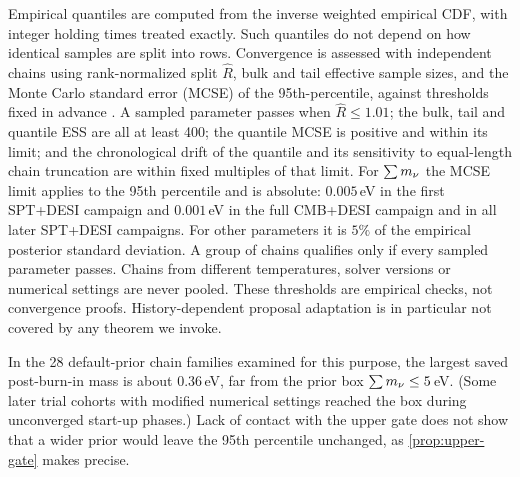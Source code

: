 Empirical quantiles are computed from the inverse weighted empirical CDF, with integer holding times treated exactly. Such quantiles do not depend on how identical samples are split into rows. Convergence is assessed with independent chains using rank-normalized split $\hat R$, bulk and tail effective sample sizes, and the Monte Carlo standard error (MCSE) of the 95th-percentile, against thresholds fixed in advance \cite{gelman_rubin1992,vehtari2021_rhat}. A sampled parameter passes when $\hat R\le1.01$; the bulk, tail and quantile ESS are all at least 400; the quantile MCSE is positive and within its limit; and the chronological drift of the quantile and its sensitivity to equal-length chain truncation are within fixed multiples of that limit. For $\sum m_\nu$ the MCSE limit applies to the 95th percentile and is absolute: $0.005$\,eV in the first SPT+DESI campaign and $0.001$\,eV in the full CMB+DESI campaign and in all later SPT+DESI campaigns. For other parameters it is $5\%$ of the empirical posterior standard deviation. A group of chains qualifies only if every sampled parameter passes. Chains from different temperatures, solver versions or numerical settings are never pooled. These thresholds are empirical checks, not convergence proofs. History-dependent proposal adaptation is in particular not covered by any theorem we invoke.

In the 28 default-prior chain families examined for this purpose, the largest saved post-burn-in mass is about $0.36$\,eV, far from the prior box $\sum m_\nu\le5$\,eV. (Some later trial cohorts with modified numerical settings reached the box during unconverged start-up phases.) Lack of contact with the upper gate does not show that a wider prior would leave the 95th percentile unchanged, as \cref{prop:upper-gate} makes precise.
